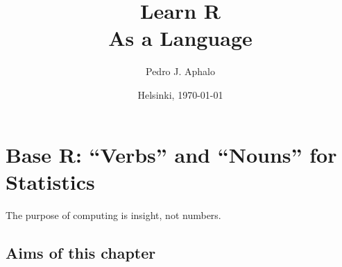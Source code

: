 \documentclass[krantz2]{krantz}\usepackage{knitr}
\begin{document}

\title{\Huge{\sffamily Learn R\\{\Large As a Language}}}

\author{Pedro J. Aphalo}

\date{Helsinki, \today}


















\frontmatter

\maketitle

\newpage

\setcounter{page}{5} %
\tableofcontents
\listoffigures
\listoftables



%



\mainmatter
















\chapter{Base R: ``Verbs'' and ``Nouns'' for Statistics}\label{chap:R:statistics}

\begin{VF}
The purpose of computing is insight, not numbers.

\nocite{Hamming1987}
\end{VF}

\section{Aims of this chapter}
\end{document}
